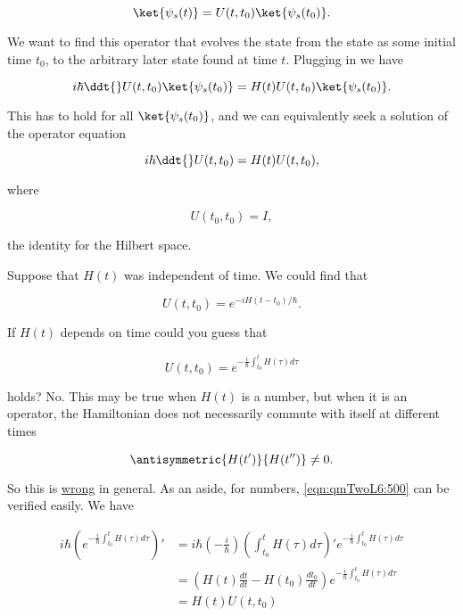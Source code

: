 \begin{equation}\label{eqn:qmTwoL6:400}
\ket{\psi_s(t)} = U(t, t_0) \ket{\psi_s(t_0)}.
\end{equation}

We want to find this operator that evolves the state from the state as some initial time $t_0$, to the arbitrary later state found at time $t$.  Plugging in we have

\begin{equation}\label{eqn:qmTwoL6:420}
i \hbar \ddt{} U(t, t_0) \ket{\psi_s(t_0)}
=
H(t) U(t, t_0) \ket{\psi_s(t_0)}.
\end{equation}

This has to hold for all $\ket{\psi_s(t_0)}$, and we can equivalently seek a solution of the operator equation

\begin{equation}\label{eqn:qmTwoL6:440}
i \hbar \ddt{} U(t, t_0) = H(t) U(t, t_0),
\end{equation}

where

\begin{equation}\label{eqn:qmTwoL6:460}
U(t_0, t_0) = I,
\end{equation}

the identity for the Hilbert space.

Suppose that $H(t)$ was independent of time.  We could find that 

\begin{equation}\label{eqn:qmTwoL6:480}
U(t, t_0) = e^{-i H(t - t_0)/\hbar}.
\end{equation}

If $H(t)$ depends on time could you guess that 

\begin{equation}\label{eqn:qmTwoL6:500}
U(t, t_0) = e^{-\frac{i}{\hbar} \int_{t_0}^t H(\tau) d\tau}
\end{equation}

holds?  No.  This may be true when $H(t)$ is a number, but when it is an operator, the Hamiltonian does not necessarily commute with itself at different times

\begin{equation}\label{eqn:qmTwoL6:520}
\antisymmetric{H(t')}{H(t'')} \ne 0.
\end{equation}

So this is \underline{wrong} in general.  As an aside, for numbers, \ref{eqn:qmTwoL6:500} can be verified easily.  We have

\begin{align*}
i \hbar \left( e^{-\frac{i}{\hbar} \int_{t_0}^t H(\tau) d\tau} \right)'
&=
i \hbar \left( -\frac{i}{\hbar} \right) \left( \int_{t_0}^t H(\tau) d\tau \right)'
e^{-\frac{i}{\hbar} \int_{t_0}^t H(\tau) d\tau } \\
&=
\left( H(t) \frac{dt}{dt} - H(t_0) \frac{dt_0}{dt} \right)
e^{-\frac{i}{\hbar} \int_{t_0}^t H(\tau) d\tau}  \\
&= 
H(t) U(t, t_0)
\end{align*}

